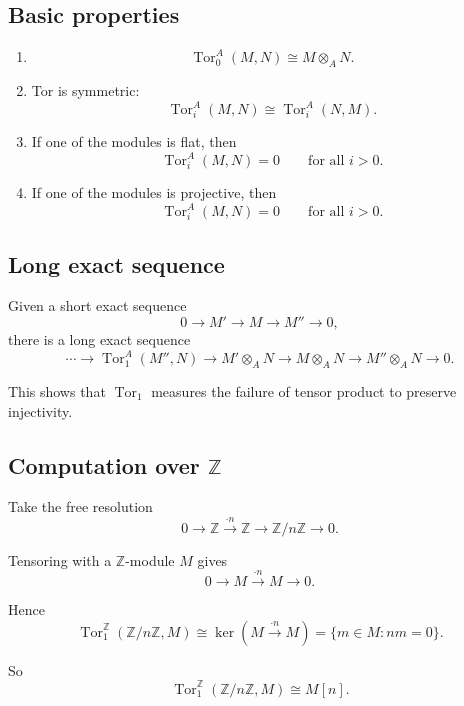 \documentclass[12pt,a4paper]{article}
\theoremstyle{notespace}
\begin{document}
\subsection{Basic properties}

\begin{enumerate}
	\item
	\[
	\operatorname{Tor}_0^A(M,N)\cong M\otimes_A N.
	\]
	
	\item Tor is symmetric:
	\[
	\operatorname{Tor}_i^A(M,N)\cong \operatorname{Tor}_i^A(N,M).
	\]
	
	\item If one of the modules is flat, then
	\[
	\operatorname{Tor}_i^A(M,N)=0
	\qquad\text{for all }i>0.
	\]
	
	\item If one of the modules is projective, then
	\[
	\operatorname{Tor}_i^A(M,N)=0
	\qquad\text{for all }i>0.
	\]
\end{enumerate}

\subsection{Long exact sequence}

Given a short exact sequence
\[
0\longrightarrow M' \longrightarrow M \longrightarrow M'' \longrightarrow 0,
\]
there is a long exact sequence
\[
\cdots \to \operatorname{Tor}_1^A(M'',N)
\to M'\otimes_A N
\to M\otimes_A N
\to M''\otimes_A N
\to 0.
\]

This shows that \(\operatorname{Tor}_1\) measures the failure of tensor product to preserve injectivity.

\subsection{Computation over \(\mathbb Z\)}

Take the free resolution
\[
0\longrightarrow \mathbb Z \xrightarrow{\cdot n} \mathbb Z \longrightarrow \mathbb Z/n\mathbb Z \longrightarrow 0.
\]

Tensoring with a \(\mathbb Z\)-module \(M\) gives
\[
0\longrightarrow M \xrightarrow{\cdot n} M \longrightarrow 0.
\]

Hence
\[
\operatorname{Tor}_1^{\mathbb Z}(\mathbb Z/n\mathbb Z,M)
\cong
\ker(M\xrightarrow{\cdot n}M)
=
\{m\in M:nm=0\}.
\]

So
\[
\boxed{
	\operatorname{Tor}_1^{\mathbb Z}(\mathbb Z/n\mathbb Z,M)\cong M[n].
}
\]
\end{document}

